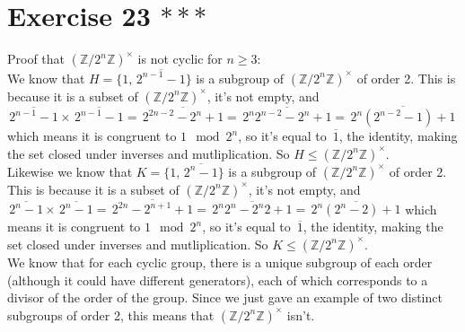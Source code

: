 \documentclass[12pt]{article}
\newcommand{\Z}{\mathbb{Z}}
\newcommand{\olsi}[1]{\,\overline{\!{#1}}}
\begin{document}
    \section*{Exercise 23 $***$}
    Proof that $(\Z/2^n\Z)^\times$ is not cyclic for $n \geqslant 3$: \\
    We know that $H = \{1, \olsi{2^{n-1} - 1}\}$
    is a subgroup of $(\Z/2^n\Z)^\times$ of order 2.
    This is because it is a subset of $(\Z/2^n\Z)^\times$,
    it's not empty, 
    and $\olsi{2^{n-1} - 1} \times \olsi{2^{n-1} - 1}
    = \olsi{2^{2n-2} - 2^n + 1} = \olsi{2^n2^{n-2} - 2^n + 1}
    =  \olsi{2^n(2^{n-2} - 1) + 1}$
    which means it is congruent to  $1 \mod 2^n$,
    so it's equal to $\olsi{1}$, the identity,
    making the set closed under inverses and mutliplication.
    So $H \leqslant (\Z/2^n\Z)^\times$. \\
    Likewise we know that $K = \{1, \olsi{2^n - 1}\}$
    is a subgroup of $(\Z/2^n\Z)^\times$ of order 2.
    This is because it is a subset of $(\Z/2^n\Z)^\times$,
    it's not empty, 
    and $\olsi{2^n - 1} \times \olsi{2^n - 1}
    = \olsi{2^{2n} - 2^{n+1} + 1} = \olsi{2^n2^n - 2^n2 + 1}
    =  \olsi{2^n(2^n - 2) + 1}$
    which means it is congruent to  $1 \mod 2^n$,
    so it's equal to $\olsi{1}$, the identity,
    making the set closed under inverses and mutliplication.
    So $K \leqslant (\Z/2^n\Z)^\times$. \\
    We know that for each cyclic group,
    there is a unique subgroup of each order
    (although it could have different generators),
    each of which corresponds to a divisor of the order of the group.
    Since we just gave an example of two distinct
    subgroups of order 2,
    this means that $(\Z/2^n\Z)^\times$ isn't.
\end{document}
